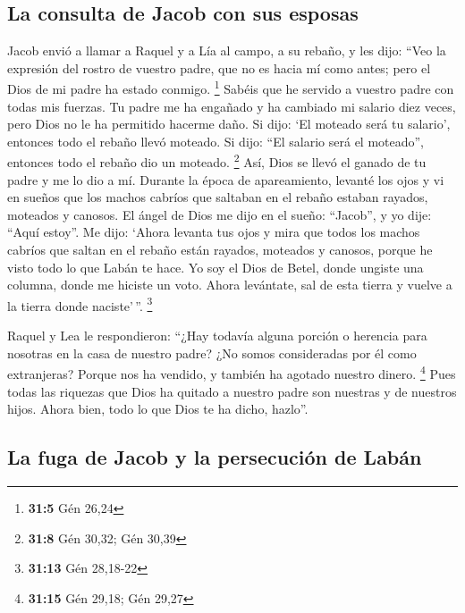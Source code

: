 \begin{paracol}{2}
\hypertarget{la-consulta-de-jacob-con-sus-esposas}{%
\subsection{La consulta de Jacob con sus
esposas}\label{la-consulta-de-jacob-con-sus-esposas}}

 Jacob envió a llamar a Raquel y a Lía al campo, a su
rebaño,  y les dijo: ``Veo la expresión del rostro de
vuestro padre, que no es hacia mí como antes; pero el Dios de mi padre
ha estado conmigo. \footnote{\textbf{31:5} Gén 26,24} 
Sabéis que he servido a vuestro padre con todas mis fuerzas.
 Tu padre me ha engañado y ha cambiado mi salario diez
veces, pero Dios no le ha permitido hacerme daño.  Si
dijo: `El moteado será tu salario', entonces todo el rebaño llevó
moteado. Si dijo: ``El salario será el moteado'', entonces todo el
rebaño dio un moteado. \footnote{\textbf{31:8} Gén 30,32; Gén 30,39}
 Así, Dios se llevó el ganado de tu padre y me lo dio a
mí.  Durante la época de apareamiento, levanté los ojos y
vi en sueños que los machos cabríos que saltaban en el rebaño estaban
rayados, moteados y canosos.  El ángel de Dios me dijo en
el sueño: ``Jacob'', y yo dije: ``Aquí estoy''.  Me dijo:
`Ahora levanta tus ojos y mira que todos los machos cabríos que saltan
en el rebaño están rayados, moteados y canosos, porque he visto todo lo
que Labán te hace.  Yo soy el Dios de Betel, donde
ungiste una columna, donde me hiciste un voto. Ahora levántate, sal de
esta tierra y vuelve a la tierra donde naciste'\,''. \footnote{\textbf{31:13}
  Gén 28,18-22}

 Raquel y Lea le respondieron: ``¿Hay todavía alguna
porción o herencia para nosotras en la casa de nuestro padre?
 ¿No somos consideradas por él como extranjeras? Porque
nos ha vendido, y también ha agotado nuestro dinero. \footnote{\textbf{31:15}
  Gén 29,18; Gén 29,27}  Pues todas las riquezas que Dios
ha quitado a nuestro padre son nuestras y de nuestros hijos. Ahora bien,
todo lo que Dios te ha dicho, hazlo''.

\hypertarget{la-fuga-de-jacob-y-la-persecuciuxf3n-de-labuxe1n}{%
\subsection{La fuga de Jacob y la persecución de
Labán}\label{la-fuga-de-jacob-y-la-persecuciuxf3n-de-labuxe1n}}


\end{paracol}
